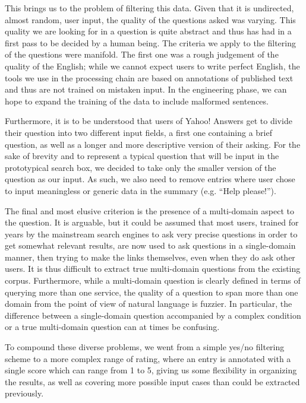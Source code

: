 This brings us to the problem of filtering this data. Given that it is undirected, almost random, user input, the quality of the questions asked was varying. This quality we are looking for in a question is quite abstract and thus has had in a first pass to be decided by a human being. The criteria we apply to the filtering of the questions were manifold. The first one was a rough judgement of the quality of the English; while we cannot expect users to write perfect English, the tools we use in the processing chain are based on annotations of published text and thus are not trained on mistaken input. In the engineering phase, we can hope to expand the training of the data to include malformed sentences.

Furthermore, it is to be understood that users of Yahoo! Answers get to divide their question into two different input fields, a first one containing a brief question, as well as a longer and more descriptive version of their asking. For the sake of brevity and to represent a typical question that will be input in the prototypical search box, we decided to take only the smaller version of the question as our input. As such, we also need to remove entries where user chose to input meaningless or generic data in the summary (e.g. ``Help please!'').

The final and most elusive criterion is the presence of a multi-domain aspect to the question. It is arguable, but it could be assumed that most users, trained for years by the mainstream search engines to ask very precise questions in order to get somewhat relevant results, are now used to ask questions in a single-domain manner, then trying to make the links themselves, even when they do ask other users. It is thus difficult to extract true multi-domain questions from the existing corpus. Furthermore, while a multi-domain question is clearly defined in terms of querying more than one service, the quality of a question to span more than one domain from the point of view of natural language is fuzzier. In particular, the difference between a single-domain question accompanied by a complex condition or a true multi-domain question can at times be confusing.

To compound these diverse problems, we went from a simple yes/no filtering scheme to a more complex range of rating, where an entry is annotated with a single score which can range from 1 to 5, giving us some flexibility in organizing the results, as well as covering more possible input cases than could be extracted previously.

